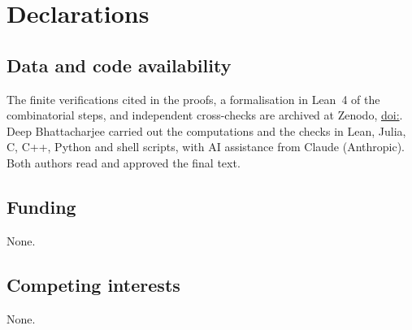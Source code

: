 \section*{Declarations}

\subsection*{Data and code availability}
The finite verifications cited in the proofs, a formalisation in Lean~4 of
the combinatorial steps, and independent cross-checks are archived at
Zenodo, \href{https://doi.org/\zenodoCodeID}{doi:\zenodoCodeID}. Deep
Bhattacharjee carried out the computations and the checks in Lean, Julia, C,
C++, Python and shell scripts, with AI assistance from Claude (Anthropic).
Both authors read and approved the final text.

\subsection*{Funding}
None.

\subsection*{Competing interests}
None.
